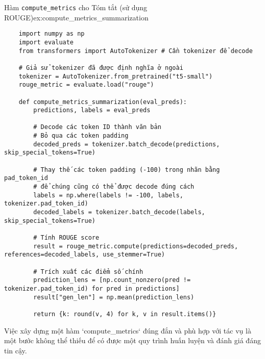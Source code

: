 \begin{example}{Hàm \texttt{compute\_metrics} cho Tóm tắt (sử dụng ROUGE)}{ex:compute_metrics_summarization}
    \begin{verbatim}
    import numpy as np
    import evaluate
    from transformers import AutoTokenizer # Cần tokenizer để decode

    # Giả sử tokenizer đã được định nghĩa ở ngoài
    tokenizer = AutoTokenizer.from_pretrained("t5-small")
    rouge_metric = evaluate.load("rouge")

    def compute_metrics_summarization(eval_preds):
        predictions, labels = eval_preds

        # Decode các token ID thành văn bản
        # Bỏ qua các token padding
        decoded_preds = tokenizer.batch_decode(predictions, skip_special_tokens=True)
        
        # Thay thế các token padding (-100) trong nhãn bằng pad_token_id
        # để chúng cũng có thể được decode đúng cách
        labels = np.where(labels != -100, labels, tokenizer.pad_token_id)
        decoded_labels = tokenizer.batch_decode(labels, skip_special_tokens=True)

        # Tính ROUGE score
        result = rouge_metric.compute(predictions=decoded_preds, references=decoded_labels, use_stemmer=True)

        # Trích xuất các điểm số chính
        prediction_lens = [np.count_nonzero(pred != tokenizer.pad_token_id) for pred in predictions]
        result["gen_len"] = np.mean(prediction_lens)
        
        return {k: round(v, 4) for k, v in result.items()}
    \end{verbatim}
\end{example}

Việc xây dựng một hàm `compute\_metrics` đúng đắn và phù hợp với tác vụ là một bước không thể thiếu để có được một quy trình huấn luyện và đánh giá đáng tin cậy.